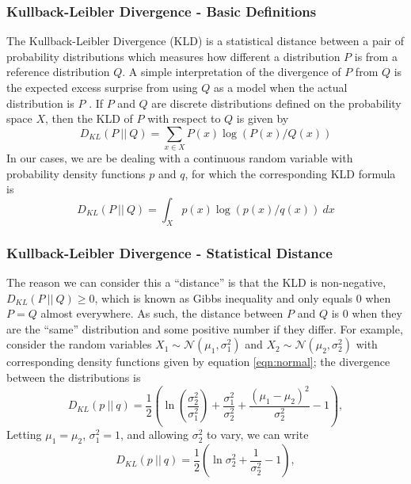 \documentclass[11pt,aspectratio=169]{beamer}
\newcommand{\parens}[1]{\left(#1\right)}
\begin{document}
    \begin{frame}
        \frametitle{Kullback-Leibler Divergence - Basic Definitions}
        The Kullback-Leibler Divergence (KLD) is a statistical distance between a 
        pair of probability distributions which measures how different a distribution $P$ is 
        from a reference distribution $Q$. A simple interpretation of the 
        divergence of $P$ from $Q$ is the expected excess surprise from using $Q$ as a model 
        when the actual distribution is $P$ \cite{kullback}. If $P$ and $Q$ are discrete distributions 
        defined on the probability space $X$, then the KLD of $P$ with 
        respect to $Q$ is given by
        \begin{equation}
            D_{KL}(P\ |\!|\ Q) = \sum_{x \in X}P(x)\log\parens{P(x)/Q(x)} \label{eqn:discrete KLD}
        \end{equation}
        In our cases, we are be dealing with a continuous random variable
        with probability density functions $p$ and $q$, for which the corresponding KLD formula 
        is
        \begin{equation}
            D_{KL}(P\ |\!|\ Q) = \int_X p(x)\log\parens{p(x)/q(x)}\ dx \label{eqn:continuous KLD}
        \end{equation}
    \end{frame}

    \begin{frame}
        \frametitle{Kullback-Leibler Divergence - Statistical Distance}
        The reason we can consider this a ``distance'' is that the KLD 
        is non-negative, $D_{KL}(P\ |\!|\ Q) \geq 0$, which is known as Gibbs 
        inequality and only equals 0 when $P = Q$ almost everywhere. As such, the distance
        between $P$ and $Q$ is 0 when they are the ``same'' distribution and some positive 
        number if they differ. For example, consider the random variables $X_1 \sim 
        \mathcal{N}(\mu_1, \sigma_1^2)$ and $X_2 \sim \mathcal{N}(\mu_2, \sigma_2^2)$ 
        with corresponding density functions given by equation \ref{eqn:normal}; the divergence 
        between the distributions is
        \begin{equation}
            D_{KL}(p\ |\!|\ q) = \frac{1}{2}\parens{\ln\parens{\frac{\sigma_2^2}{\sigma_1^2}} + 
            \frac{\sigma_1^2}{\sigma_2^2} + \frac{(\mu_1 - \mu_2)^2}{\sigma_2^2} - 1}, \label{eqn:normal divergence}
        \end{equation}
        Letting $\mu_1 = \mu_2$, $\sigma_1^2 = 1$, and allowing $\sigma_2^2$ to vary, we can 
        write 
        \begin{equation}
            D_{KL}(p\ |\!|\ q) = \frac{1}{2}\parens{\ln\sigma_2^2 + 
            \frac{1}{\sigma_2^2} - 1}, \label{eqn:normal divergence2}
        \end{equation}
    \end{frame}
\end{document}
